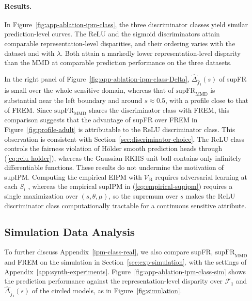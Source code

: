 \documentclass{article} %
\begin{document}
\paragraph{Results.}  In Figure~\ref{fig:app-ablation-ipm-class}, the three discriminator classes yield similar prediction-level curves.  The ReLU and the sigmoid discriminators attain comparable representation-level disparities, and their ordering varies with the dataset and with $\lambda$.  Both attain a markedly lower representation-level disparity than the MMD at comparable prediction performance on the three datasets.

In the right panel of Figure~\ref{fig:app-ablation-ipm-class-Delta}, $\widehat{\Delta}_{\hat{f}_1}(s)$ of supFR is small over the whole sensitive domain, whereas that of $\mathrm{supFR}_{\mathrm{MMD}}$ is substantial near the left boundary and around $s\approx0.5$, with a profile close to that of FREM.  Since $\mathrm{supFR}_{\mathrm{MMD}}$ shares the discriminator class with FREM, this comparison suggests that the advantage of supFR over FREM in Figure~\ref{fig:profile-adult} is attributable to the ReLU discriminator class.  This observation is consistent with Section~\ref{sec:discriminator-choice}. The ReLU class controls the fairness violation of H\"older smooth prediction heads through (\ref{eq:relu-holder}), whereas the Gaussian RKHS unit ball contains only infinitely differentiable functions.  
These results do not undermine the motivation of supIPM.
Computing the empirical EIPM with $\mathcal{V}_{\mathrm{R}}$ requires adversarial learning at each $S_i$ , whereas the empirical supIPM in (\ref{eq:empirical-supipm}) requires a single maximization over $(s,\theta,\mu)$, so the supremum over $s$ makes the ReLU discriminator class computationally tractable for a continuous sensitive attribute.

\subsection{Simulation Data Analysis}
\label{ipm-class-simul}

To further discuss Appendix~\ref{ipm-class-real}, we also compare supFR, $\mathrm{supFR}_{\mathrm{MMD}}$ and FREM on the simulation in Section~\ref{sec:exp-simulation}, with the settings of Appendix~\ref{app:synth-experiments}.  Figure~\ref{fig:app-ablation-ipm-class-sim} shows the prediction performance against the representation-level disparity over $\mathcal{F}_1$ and $\widehat{\Delta}_{\hat{f}_1}(s)$ of the circled models, as in Figure~\ref{fig:simulation}.
\end{document}
